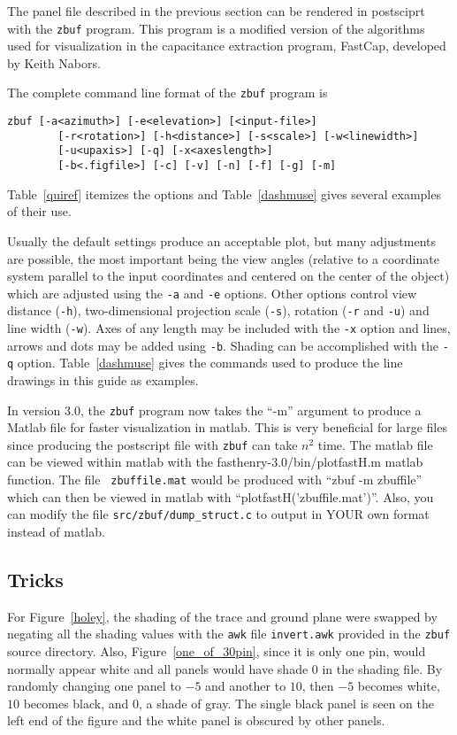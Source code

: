The panel file described in the previous section can be rendered in
postsciprt with the {\tt zbuf} program.  This program is a modified
version of the algorithms used for visualization in the capacitance
extraction program, FastCap, developed by Keith Nabors.

\begin{minipage}{\textwidth}
The complete command line format of the {\tt zbuf} program is
\begin{verbatim}
zbuf [-a<azimuth>] [-e<elevation>] [<input-file>]
        [-r<rotation>] [-h<distance>] [-s<scale>] [-w<linewidth>]
        [-u<upaxis>] [-q] [-x<axeslength>]
        [-b<.figfile>] [-c] [-v] [-n] [-f] [-g] [-m]
\end{verbatim}
\end{minipage}

Table~\ref{quiref} itemizes the options and Table~\ref{dashmuse} gives
several examples of their use.

Usually the default settings
produce an acceptable plot, but many adjustments are possible,
the most important being the  view angles (relative to a coordinate
system parallel to the input coordinates and centered on the 
center of the object) which are adjusted using the
{\tt -a} and {\tt -e} options.  Other options control view distance
({\tt -h}), two-dimensional projection scale ({\tt -s}), rotation
({\tt -r} and {\tt -u}) and line width ({\tt -w}). Axes of any length
may be included  with the {\tt -x} option and lines, arrows and dots may be
added using {\tt -b}.  Shading can be accomplished with the {\tt -q} option.
Table~\ref{dashmuse} gives the commands used to produce the line
drawings in this guide as examples. 

In version 3.0, the {\tt zbuf} program now takes the ``-m'' argument
to produce a 
Matlab file for faster visualization in matlab.  This is very beneficial for
large files since producing the postscript file with {\tt zbuf} can
take $n^2$ time. 
The matlab file can be viewed within matlab with the
fasthenry-3.0/bin/plotfastH.m matlab function.  The file {\tt
  zbuffile.mat} would be produced with ``zbuf -m zbuffile'' which can
then be viewed in matlab with ``plotfastH('zbuffile.mat')''.
Also, you can modify the file {\tt src/zbuf/dump\_struct.c} to output
in YOUR own 
format instead of matlab.

\subsection{Tricks}
For Figure~\ref{holey}, the shading of the trace and ground plane were
swapped by negating all the shading values with the {\tt awk} file
{\tt invert.awk} provided in the {\tt zbuf} source directory.  Also,
Figure~\ref{one_of_30pin}, since it is only one pin, would normally
appear white and all panels would have shade $0$ in the shading file.
By randomly changing one panel to $-5$ and another to $10$, then $-5$
becomes white, $10$ becomes black, and $0$, a shade of gray.
The single black panel is seen on the left end of the figure and the
white panel is obscured by other panels.

